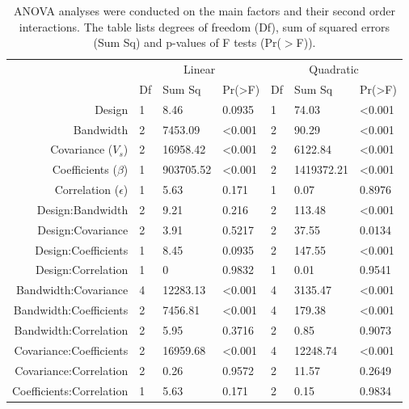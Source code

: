 \documentclass[a4paper]{article} 	%
\begin{document}
\begin{table}[H]
	\centering
	\caption{ANOVA analyses were conducted on the main factors and their second order interactions. The table lists degrees of freedom (Df), sum of squared errors (Sum Sq) and p-values of F tests (Pr($>$F)). }\label{tb:LMMoutput}
	\begin{tabular}{r | lll | lll}
		\toprule
		 & \multicolumn{3}{c|}{Linear}  & \multicolumn{3}{c}{Quadratic}  \\
    & Df & Sum Sq  & Pr(\textgreater{}F) & Df & Sum Sq  & Pr(\textgreater{}F) \\ \midrule 
Design & 1  & 8.46  & 0.0935  & 1  & 74.03 & \textless{}0.001  \\
Bandwidth & 2  & 7453.09 & \textless{}0.001  & 2  & 90.29  & \textless{}0.001  \\
Covariance ($V_s$)  & 2  & 16958.42  & \textless{}0.001  & 2  & 6122.84 & \textless{}0.001 \\
Coefficients ($\beta$)  & 1  & 903705.52 & \textless{}0.001  & 2  & 1419372.21 & \textless{}0.001  \\
Correlation  ($\epsilon$)  & 1  & 5.63  & 0.171   & 1  & 0.07  & 0.8976  \\
Design:Bandwidth  & 2  & 9.21 & 0.216  & 2  & 113.48   & \textless{}0.001  \\
Design:Covariance & 2  & 3.91 & 0.5217  & 2  & 37.55  & 0.0134 \\
Design:Coefficients  & 1  & 8.45 & 0.0935  & 2  & 147.55 & \textless{}0.001  \\
Design:Correlation  & 1  & 0  & 0.9832  & 1  & 0.01  & 0.9541  \\
Bandwidth:Covariance   & 4  & 12283.13  & \textless{}0.001  & 4  & 3135.47  & \textless{}0.001  \\
Bandwidth:Coefficients & 2  & 7456.81 & \textless{}0.001  & 4  & 179.38 & \textless{}0.001  \\
Bandwidth:Correlation  & 2  & 5.95  & 0.3716  & 2  & 0.85  & 0.9073  \\
Covariance:Coefficients  & 2  & 16959.68  & \textless{}0.001  & 4  & 12248.74 & \textless{}0.001  \\
Covariance:Correlation & 2  & 0.26  & 0.9572  & 2  & 11.57  & 0.2649  \\
Coefficients:Correlation & 1  & 5.63  & 0.171   & 2  & 0.15  & 0.9834  \\ \bottomrule  
	\end{tabular}
\end{table}
\end{document}
